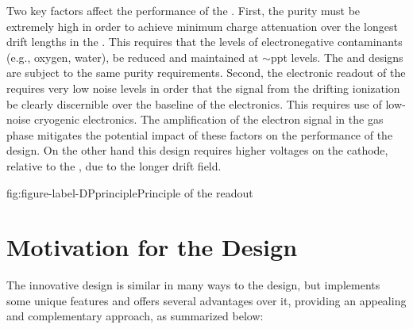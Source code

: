 Two key factors affect the performance of the  \lartpc{}.  First, the \lar purity must be extremely high in order to achieve minimum charge attenuation over the longest drift lengths in the \lartpc{}.  This requires that the levels of electronegative contaminants (e.g., oxygen, water), be reduced and
maintained at $\sim$ppt levels.  The \dual and \single designs are subject to the same purity requirements. 
%
Second, the electronic readout
of the \dual requires very low noise levels in order that the signal from the drifting ionization  be clearly discernible over the baseline of the electronics.  This requires use of low-noise cryogenic electronics. 
%
The amplification of the electron signal in the gas phase mitigates the potential impact of these factors on the performance of the \dual design.  On the other hand this design requires  higher voltages on the cathode, relative to the \single, due to the longer drift field. 

\begin{dunefigure}{fig:figure-label-DPprinciple}{Principle of the \dual readout}
\end{dunefigure}

\section{Motivation for the \dual {} Design} %
\label{sec:fddp-design-motivation}

The innovative \dual design is similar in many ways to the \single design, but implements some unique features and offers several advantages over it, providing an appealing and complementary approach, as summarized below:

